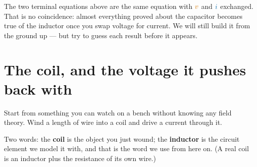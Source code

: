 \documentclass[11pt,a4paper]{article}
\newcommand{\Icol}[1]{\textcolor{ccur}{#1}}
\newcommand{\Vcol}[1]{\textcolor{cvolt}{#1}}
\begin{document}
\begin{center}
\end{center}

The two terminal equations above are the same equation with $\Vcol{v}$ and $\Icol{i}$
exchanged. That is no coincidence: almost everything proved about the capacitor becomes
true of the inductor once you swap voltage for current. We will still build it from the
ground up --- but try to guess each result before it appears.

\section{The coil, and the voltage it pushes back with}

Start from something you can watch on a bench without knowing any field theory. Wind a
length of wire into a coil and drive a current through it.

Two words: the \textbf{coil} is the object you just wound; the \textbf{inductor} is the
circuit element we model it with, and that is the word we use from here on. (A real coil
is an inductor plus the resistance of its own wire.)
\end{document}
